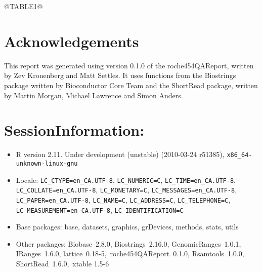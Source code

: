 \documentclass[11pt]{article}
\newcommand{\Rpackage}[1]{{\textsf{#1}}}
\begin{document}
@TABLE1@

 


\section{Acknowledgements}
\label{sec:ack}

This report was generated using version 0.1.0 of the 
\Rpackage{roche454QAReport}, written by Zev Kronenberg and Matt Settles. 
It uses functions from the \Rpackage{Biostrings} package
written by Bioconductor Core Team and the \Rpackage{ShortRead} package, written
by Martin Morgan, Michael Lawrence and Simon Anders.

\section*{SessionInformation: }
\begin{itemize}\raggedright
  \item R version 2.11. Under development (unstable) (2010-03-24 r51385), \verb|x86_64-unknown-linux-gnu|
  \item Locale: \verb|LC_CTYPE=en_CA.UTF-8|, \verb|LC_NUMERIC=C|, \verb|LC_TIME=en_CA.UTF-8|, \verb|LC_COLLATE=en_CA.UTF-8|, \verb|LC_MONETARY=C|, \verb|LC_MESSAGES=en_CA.UTF-8|, \verb|LC_PAPER=en_CA.UTF-8|, \verb|LC_NAME=C|, \verb|LC_ADDRESS=C|, \verb|LC_TELEPHONE=C|, \verb|LC_MEASUREMENT=en_CA.UTF-8|, \verb|LC_IDENTIFICATION=C|
  \item Base packages: base, datasets, graphics, grDevices, methods, stats, utils
  \item Other packages: Biobase~2.8.0, Biostrings~2.16.0, GenomicRanges~1.0.1, IRanges~1.6.0, lattice~0.18-5,~roche454QAReport~0.1.0, Rsamtools~1.0.0, ShortRead~1.6.0,~xtable 1.5-6
\end{itemize}



\end{document}
